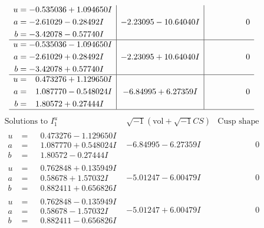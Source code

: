 \documentclass[1p]{elsarticle_modified}
\theoremstyle{definition}
\newcommand{\I}{\sqrt{-1}}
\begin{document}
$$\begin{array}{c|c|c}
\begin{aligned}
u &= -0.535036 + 1.094650 I \\
a &= -2.61029 - 0.28492 I \\
b &= -3.42078 - 0.57740 I\end{aligned}
 & -2.23095 - 10.64040 I & \phantom{-0.000000 } 0 \\ \hline\begin{aligned}
u &= -0.535036 - 1.094650 I \\
a &= -2.61029 + 0.28492 I \\
b &= -3.42078 + 0.57740 I\end{aligned}
 & -2.23095 + 10.64040 I & \phantom{-0.000000 } 0 \\ \hline\begin{aligned}
u &= \phantom{-}0.473276 + 1.129650 I \\
a &= \phantom{-}1.087770 - 0.548024 I \\
b &= \phantom{-}1.80572 + 0.27444 I\end{aligned}
 & -6.84995 + 6.27359 I & \phantom{-0.000000 } 0\\
 \hline 
 \end{array}$$\newpage$$\begin{array}{c|c|c}  
\text{Solutions to }I^u_{1}& \I (\text{vol} + \sqrt{-1}CS) & \text{Cusp shape}\\
 \hline 
\begin{aligned}
u &= \phantom{-}0.473276 - 1.129650 I \\
a &= \phantom{-}1.087770 + 0.548024 I \\
b &= \phantom{-}1.80572 - 0.27444 I\end{aligned}
 & -6.84995 - 6.27359 I & \phantom{-0.000000 } 0 \\ \hline\begin{aligned}
u &= \phantom{-}0.762848 + 0.135949 I \\
a &= \phantom{-}0.58678 + 1.57032 I \\
b &= \phantom{-}0.882411 + 0.656826 I\end{aligned}
 & -5.01247 - 6.00479 I & \phantom{-0.000000 } 0 \\ \hline\begin{aligned}
u &= \phantom{-}0.762848 - 0.135949 I \\
a &= \phantom{-}0.58678 - 1.57032 I \\
b &= \phantom{-}0.882411 - 0.656826 I\end{aligned}
 & -5.01247 + 6.00479 I & \phantom{-0.000000 } 0 \\ \hline\begin{aligned}

\end{aligned}
\end{array}$$
\end{document}
